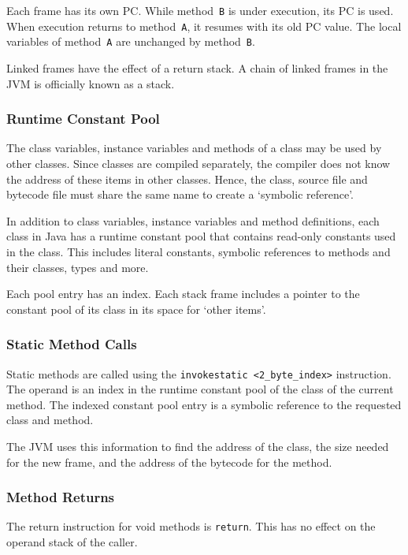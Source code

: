 Each frame has its own PC\@.
While method~\texttt{B} is under execution, its PC is used.
When execution returns to method~\texttt{A}, it resumes with its old PC value.
The local variables of method~\texttt{A} are unchanged by method~\texttt{B}.

Linked frames have the effect of a return stack.
A chain of linked frames in the JVM is officially known as a stack.

\subsubsection{Runtime Constant Pool}

The class variables, instance variables and methods of a class may be used by other classes.
Since classes are compiled separately, the compiler does not know the address of these items in other classes.
Hence, the class, source file and bytecode file must share the same name to create a `symbolic reference'.

In addition to class variables, instance variables and method definitions, each class in Java has a runtime constant pool that contains read-only constants used in the class.
This includes literal constants, symbolic references to methods and their classes, types and more.

Each pool entry has an index.
Each stack frame includes a pointer to the constant pool of its class in its space for `other items'.

\subsubsection{Static Method Calls}

Static methods are called using the \texttt{invokestatic <2\_byte\_index>} instruction.
The operand is an index in the runtime constant pool of the class of the current method.
The indexed constant pool entry is a symbolic reference to the requested class and method.

The JVM uses this information to find the address of the class, the size needed for the new frame, and the address of the bytecode for the method.

\subsubsection{Method Returns}

The return instruction for void methods is \texttt{return}.
This has no effect on the operand stack of the caller.

